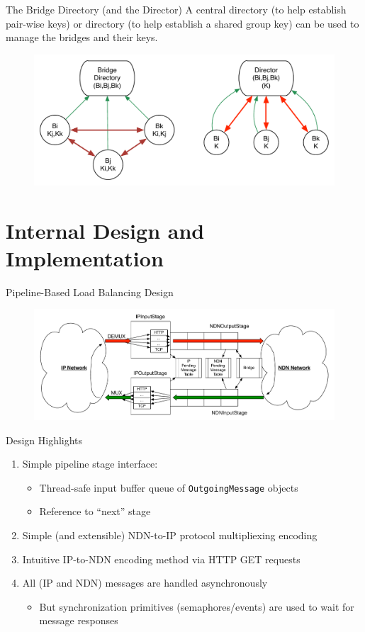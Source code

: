 \documentclass[handout]{beamer}
\begin{document}
\begin{frame}{The Bridge Directory (and the Director)}
	A central directory (to help establish pair-wise keys) or directory (to help establish a shared group key) can be used to manage the bridges and their keys.
	\begin{figure}[h]
		\includegraphics[scale=0.5]{img/gateway_group.pdf}
	\end{figure}
\end{frame}

\section{Internal Design and Implementation}
\begin{frame}{Pipeline-Based Load Balancing Design}
	\begin{figure}[h]
		\includegraphics[scale=0.34]{img/pipeline.pdf}
	\end{figure}
\end{frame}

\begin{frame}{Design Highlights}
	\begin{enumerate}
		\item Simple pipeline stage interface:
		\begin{itemize}
			\item Thread-safe input buffer queue of {\tt OutgoingMessage} objects
			\item Reference to ``next'' stage
		\end{itemize}
		\item Simple (and extensible) NDN-to-IP protocol multipliexing encoding
		\item Intuitive IP-to-NDN encoding method via HTTP GET requests
		\item All (IP and NDN) messages are handled asynchronously
		\begin{itemize}
			\item But synchronization primitives (semaphores/events) are used to wait for message responses
		\end{itemize}
	\end{enumerate}	
\end{frame}
\end{document}
